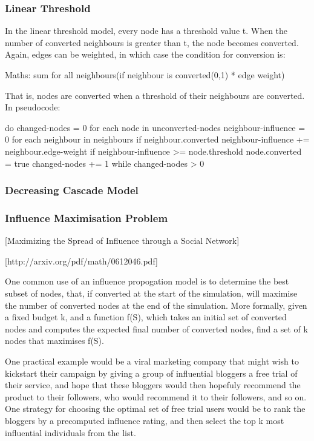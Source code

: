 \subsubsection{Linear Threshold}
 In the linear threshold model, every node has a threshold value t. When the number of converted neighbours is greater than t, the node becomes converted. Again, edges can be weighted, in which case the condition for conversion is:

Maths: sum for all neighbours(if neighbour is converted(0,1) * edge weight)

That is, nodes are converted when a threshold of their neighbours are converted. In pseudocode:

do {
  changed-nodes = 0
  for each node in unconverted-nodes {
    neighbour-influence = 0
    for each neighbour in neighbours {
      if neighbour.converted {
        neighbour-influence += neighbour.edge-weight
      }
    }
    if neighbour-influence >= node.threshold {
      node.converted = true
      changed-nodes += 1
    } 
  }
} while changed-nodes > 0

\subsubsection{Decreasing Cascade Model}


\subsubsection{Influence Maximisation Problem}

[Maximizing the Spread of Influence through a Social Network]

[http://arxiv.org/pdf/math/0612046.pdf]

One common use of an influence propogation model is to determine the best subset of nodes, that, if converted at the start of the simulation, will maximise the number of converted nodes at the end of the simulation. More formally, given a fixed budget k, and a function f(S), which takes an initial set of converted nodes and computes the expected final number of converted nodes, find a set of k nodes that maximises f(S).

One practical example would be a viral marketing company that might wish to kickstart their campaign by giving a group of influential bloggers a free trial of their service, and hope that these bloggers would then hopefuly recommend the product to their followers, who would recommend it to their followers, and so on. One strategy for choosing the optimal set of free trial users would be to rank the bloggers by a precomputed influence rating, and then select the top k most influential individuals from the list.

